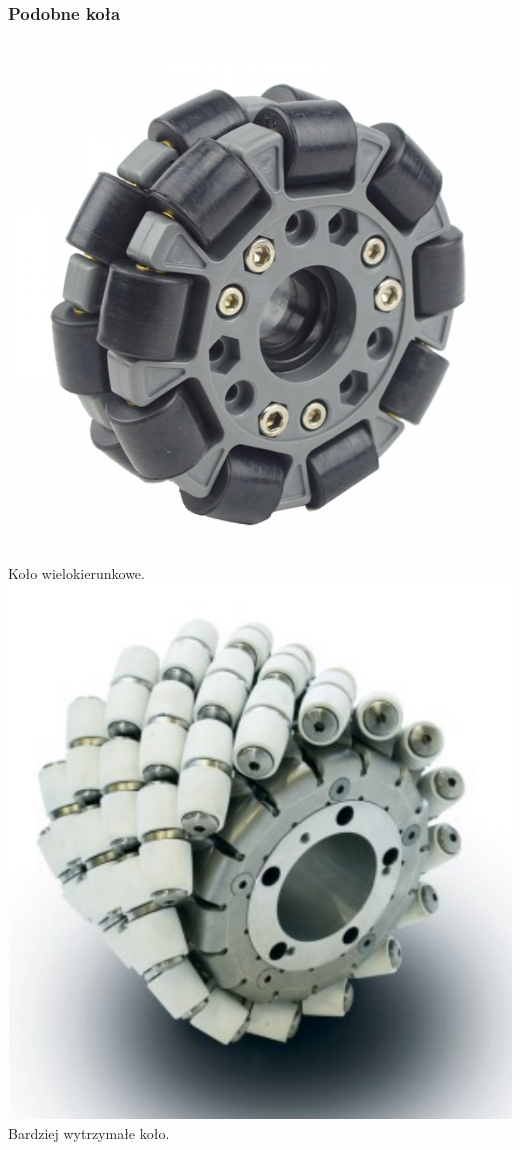 \documentclass{beamer}
\begin{document}
	\begin{frame}
		\frametitle{Podobne koła}
		\begin{columns}[c]
			\centering
			\includegraphics[width=\textwidth]{graphics/omni.png} \\
			Koło wielokierunkowe.\footnotemark[2]
			\centering
			\includegraphics[width=\textwidth]{graphics/heavy.png} \\
			Bardziej wytrzymałe koło.\footnotemark[3]
		\end{columns}
	\end{frame}
\end{document}
